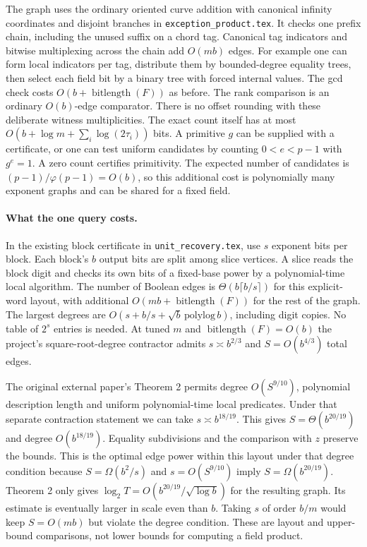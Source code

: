 \documentclass[11pt]{article}
\begin{document}
The graph uses the ordinary oriented curve addition with canonical
infinity coordinates and disjoint branches in \texttt{exception\_product.tex}.
It checks one prefix chain, including the unused suffix on a chord
tag. Canonical tag indicators and bitwise multiplexing across the
chain add $O(mb)$ edges. For example one can form local indicators
per tag, distribute them by bounded-degree equality trees, then
select each field bit by a binary tree with forced internal values.
The gcd check costs $O(b+\operatorname{bitlength}(F))$ as before.
The rank comparison is an ordinary $O(b)$-edge comparator. There
is no offset rounding with these deliberate witness multiplicities.
The exact count itself has at most
$O(b+\log m+\sum_i\log(2\tau_i))$ bits. A primitive $g$ can be
supplied with a certificate, or one can test uniform candidates by
counting $0<e<p-1$ with $g^e=1$. A zero count certifies primitivity.
The expected number of candidates is $(p-1)/\varphi(p-1)=O(b)$,
so this additional cost is polynomially many exponent graphs and
can be shared for a fixed field.

\paragraph{What the one query costs.}
In the existing block certificate in \texttt{unit\_recovery.tex}, use
$s$ exponent bits per block. Each block's $b$ output bits are split
among slice vertices. A slice reads the block digit and checks its
own bits of a fixed-base power by a polynomial-time local algorithm.
The number of Boolean edges is $\Theta(b\lceil b/s\rceil)$ for this
explicit-word layout, with additional $O(mb+\operatorname{bitlength}(F))$
for the rest of the graph. The largest degrees are
$O(s+b/s+\sqrt b\,\mathrm{polylog}\,b)$, including digit copies.
No table of $2^s$ entries is needed. At tuned $m$ and
$\operatorname{bitlength}(F)=O(b)$ the project's square-root-degree
contractor admits $s\asymp b^{2/3}$ and $S=O(b^{4/3})$ total edges.

The original external paper's Theorem 2 permits degree $O(S^{9/10})$,
polynomial description length and uniform polynomial-time local
predicates. Under that separate contraction statement we can take
$s\asymp b^{18/19}$. This gives $S=\Theta(b^{20/19})$ and degree
$O(b^{18/19})$. Equality subdivisions and the comparison with $z$
preserve the bounds. This is the optimal edge power within this
layout under that degree condition because $S=\Omega(b^2/s)$ and
$s=O(S^{9/10})$ imply $S=\Omega(b^{20/19})$. Theorem 2 only gives
$\log_2 T=O(b^{20/19}/\sqrt{\log b})$ for the resulting graph.
Its estimate is eventually larger in scale even than $b$.
Taking $s$ of order $b/m$ would keep $S=O(mb)$ but violate the
degree condition. These are layout and upper-bound comparisons,
not lower bounds for computing a field product.
\end{document}
